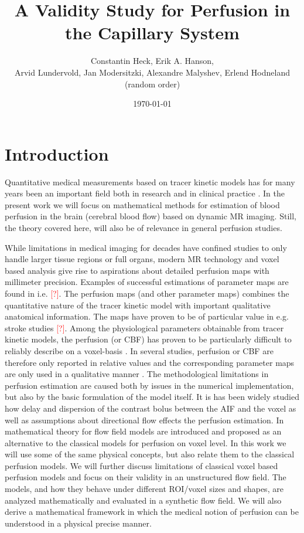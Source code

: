 \documentclass[paper=a4, fontsize=11pt,parskip=half,headings=small]{scrartcl}
\title{A Validity Study for Perfusion in the Capillary System}
\author{Constantin Heck, Erik A. Hanson, \\ Arvid Lundervold, Jan Modersitzki, Alexandre Malyshev, Erlend Hodneland \\ (random order)}
\date{\today}
\newcommand{\missingsource}{\textcolor{red}{[?]}}
\begin{document}
	\maketitle
	\tableofcontents

	
	\section{Introduction}
	
	Quantitative medical measurements based on tracer kinetic models has for many years been an important field both in research and in clinical practice \cite{zierler62,axel80,zierler00}. 
	In the present work we will focus on mathematical methods for estimation of blood perfusion in the brain (cerebral blood flow) based on dynamic MR imaging. 
	Still, the theory covered here, will also be of relevance in general perfusion studies.

	While limitations in medical imaging for decades have confined studies to only handle larger tissue regions or full organs, modern MR technology and voxel based analysis give rise to aspirations about detailed perfusion maps with millimeter precision.  
	Examples of successful estimations of parameter maps are found in i.e. \missingsource. 
	The perfusion maps (and other parameter maps) combines the quantitative nature of the tracer kinetic model with important qualitative anatomical information. 
	The maps have proven to be of particular value in e.g. stroke studies \missingsource. 
	Among the physiological parameters obtainable from tracer kinetic models, the perfusion (or CBF) has proven to be particularly difficult to reliably describe on a voxel-basis \cite{kudo10}.  
	In several studies, perfusion or CBF are therefore only reported in relative values and the corresponding parameter maps are only used in a qualitative manner \cite{calamante99}.
	The methodological limitations in perfusion estimation are caused both by issues in the numerical implementation, but also by the basic formulation of the model itself.  
	It is has been widely studied how delay and dispersion of the contrast bolus between the AIF and the voxel as well as assumptions about directional flow \cite{thacker03,sourbron14} effects the perfusion estimation. 
	In \cite{sourbron14} mathematical theory for flow field models are introduced and proposed as an alternative to the classical models for perfusion on voxel level. 
	In this work we will use some of the same physical concepts, but also relate them to the classical perfusion models.  
	We will further discuss limitations of classical voxel based perfusion models and focus on their validity in an unstructured flow field.
	The models, and how they behave under different ROI/voxel sizes and shapes, are analyzed mathematically and evaluated in a synthetic flow field.  
	We will also derive a mathematical framework in which the medical notion of perfusion can be understood in a physical precise manner.
\end{document}

